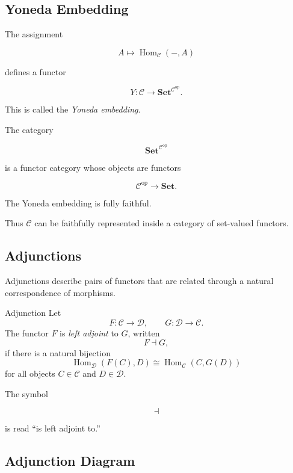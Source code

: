 \subsection{Yoneda Embedding}
\label{subsec:yoneda-embedding}

The assignment

\[ A\mapsto\operatorname{Hom}_{\mathcal C}(-,A) \]

defines a functor

\[ Y:\mathcal C\to
\mathbf{Set}^{\mathcal C^{\mathrm{op}}}. \]

This is called the \emph{Yoneda embedding}.

The category

\[ \mathbf{Set}^{\mathcal C^{\mathrm{op}}} \]

is a functor category whose objects are functors

\[ \mathcal C^{\mathrm{op}}\to\mathbf{Set}. \]

The Yoneda embedding is fully faithful.

Thus \(\mathcal C\) can be faithfully represented inside a category of
set-valued functors.

\subsection{Adjunctions}
\label{subsec:adjunctions}

Adjunctions describe pairs of functors that are related through a natural
correspondence of morphisms.

\begin{definitionbox}{Adjunction}
Let
\[ F:\mathcal C\to\mathcal D,\qquad
G:\mathcal D\to\mathcal C. \]
The functor \(F\) is \emph{left adjoint} to \(G\), written
\[ F\dashv G, \]
if there is a natural bijection
\[ \operatorname{Hom}_{\mathcal D}(F(C),D)
\cong
\operatorname{Hom}_{\mathcal C}(C,G(D)) \]
for all objects \(C\in\mathcal C\) and \(D\in\mathcal D\).
\end{definitionbox}

The symbol

\[ \dashv \]

is read ``is left adjoint to.''

\subsection{Adjunction Diagram}
\label{subsec:adjunction-diagram}


